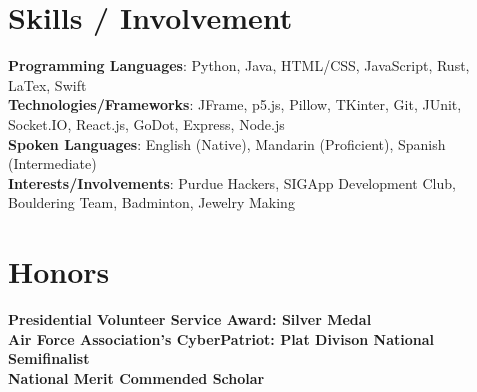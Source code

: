 \documentclass[letterpaper,11pt]{article}
\begin{document}
%
\section{Skills / Involvement}
 \begin{itemize}[leftmargin=0.15in, label={}]
    \small{\item{
     \textbf{Programming Languages}{: Python, Java, HTML/CSS, JavaScript, Rust, LaTex, Swift} \\
     \textbf{Technologies/Frameworks}{: JFrame, p5.js, Pillow, TKinter, Git, JUnit, Socket.IO, React.js, GoDot, Express, Node.js} \\
     \textbf{Spoken Languages}{: English (Native), Mandarin (Proficient), Spanish (Intermediate)} \\
     \textbf{Interests/Involvements}{: Purdue Hackers, SIGApp Development Club, Bouldering Team, Badminton, Jewelry Making} \\
    }}
 \end{itemize}
 \vspace{-16pt}


\section{Honors}
 \begin{itemize}[leftmargin=0.15in, label={}]
    \small{\item{
     \textbf{Presidential Volunteer Service Award: Silver Medal} \\
     \textbf{Air Force Association's CyberPatriot: Plat Divison National Semifinalist} \\
     \textbf{National Merit Commended Scholar} \\
    }}
 \end{itemize}
 \vspace{-16pt}
\end{document}
